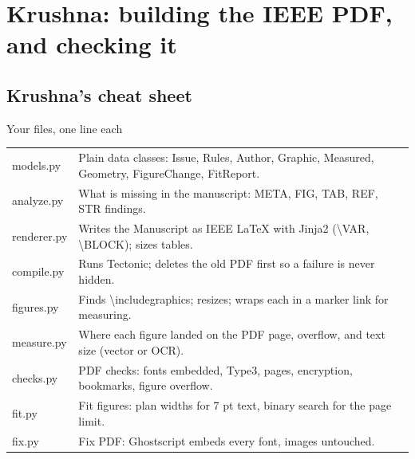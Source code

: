 \part{Krushna: building the IEEE PDF, and checking it}

\chapter{Krushna's cheat sheet}

\begin{cheat}{Your files, one line each}
\begin{tabularx}{\linewidth}{>{\ttfamily}l X}
models.py & Plain data classes: Issue, Rules, Author, Graphic, Measured, Geometry, FigureChange, FitReport.\\
analyze.py & What is missing in the manuscript: META, FIG, TAB, REF, STR findings.\\
renderer.py & Writes the Manuscript as IEEE LaTeX with Jinja2 (\textbackslash VAR, \textbackslash BLOCK); sizes tables.\\
compile.py & Runs Tectonic; deletes the old PDF first so a failure is never hidden.\\
figures.py & Finds \textbackslash includegraphics; resizes; wraps each in a marker link for measuring.\\
measure.py & Where each figure landed on the PDF page, overflow, and text size (vector or OCR).\\
checks.py & PDF checks: fonts embedded, Type3, pages, encryption, bookmarks, figure overflow.\\
fit.py & Fit figures: plan widths for 7 pt text, binary search for the page limit.\\
fix.py & Fix PDF: Ghostscript embeds every font, images untouched.\\
\end{tabularx}
\end{cheat}

\begin{center}
\end{center}

